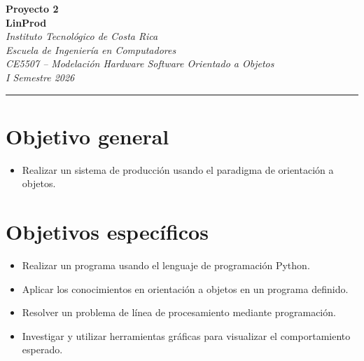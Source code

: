 \documentclass[12pt,letterpaper]{article}
\begin{document}
\begin{center}
    {\Large\bfseries Proyecto 2}\\[0.3em]
    {\LARGE\bfseries\color{tecred} LinProd}\\[1em]
    \textit{Instituto Tecnológico de Costa Rica}\\
    \textit{Escuela de Ingeniería en Computadores}\\
    \textit{CE5507 -- Modelación Hardware Software Orientado a Objetos}\\
    \textit{I Semestre 2026}
\end{center}

\vspace{1em}
\hrule
\vspace{1em}

\section*{Objetivo general}
\begin{itemize}[leftmargin=2em]
    \item Realizar un sistema de producción usando el paradigma de orientación a objetos.
\end{itemize}

\section*{Objetivos específicos}
\begin{itemize}[leftmargin=2em]
    \item Realizar un programa usando el lenguaje de programación Python.
    \item Aplicar los conocimientos en orientación a objetos en un programa definido.
    \item Resolver un problema de línea de procesamiento mediante programación.
    \item Investigar y utilizar herramientas gráficas para visualizar el comportamiento esperado.
\end{itemize}

\end{document}
